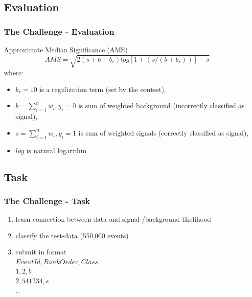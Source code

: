 		
	\subsection{Evaluation}
	\begin{frame}
		\frametitle{The Challenge - Evaluation}
			
		\begin{block}{Approximate Median Significance (AMS)}
			$$AMS = \sqrt{2 { (s + b + b_r) log[1 + (s/(b+b_{r}))] - s}} $$
			where: \begin{itemize}
				\item $ b_{r} = 10 $ is a regulization term (set by the 
					contest),
				\item $ b = \sum_{i=1}^{n} w_i, y_i=0 $ is sum of weighted
					background (incorrectly classified as signal),
				\item $ s = \sum_{i=1}^{n} w_i, y_i=1 $ is sum of weighted 
					signals (correctly classified as signal),
				\item $ log $ is natural logarithm
			\end{itemize}
		\end{block}			
	\end{frame}
	
	\subsection{Task}
	\begin{frame}
		\frametitle{The Challenge - Task}
		\begin{enumerate}
			\item learn connection between data and signal-/background-likelihood
			\item classify the test-data (550,000 events)
			\item submit in format\\
				  $EventId,RankOrder,Class$\\
				  $1,2,b$\\
  				  $2,541234,s$\\
  				  \ldots
		\end{enumerate}
	\end{frame}